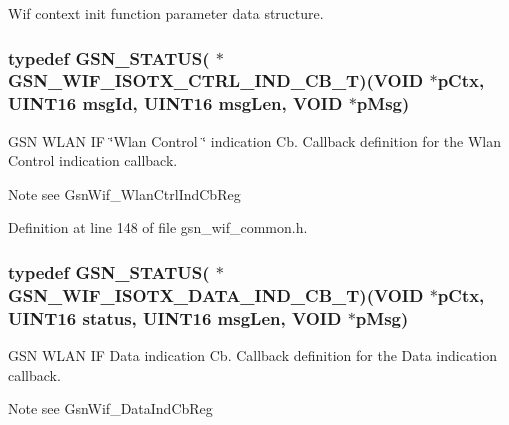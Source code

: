 Wif context init function parameter data structure. 

\hypertarget{a00635_gac721992ff2f8c904a29e80d4b2eaead3}{
\subsubsection[{GSN\_\-WIF\_\-ISOTX\_\-CTRL\_\-IND\_\-CB\_\-T}]{\setlength{\rightskip}{0pt plus 5cm}typedef {\bf GSN\_\-STATUS}( $\ast$ {\bf GSN\_\-WIF\_\-ISOTX\_\-CTRL\_\-IND\_\-CB\_\-T})(VOID $\ast$pCtx, {\bf UINT16} msgId, {\bf UINT16} msgLen, VOID $\ast$pMsg)}}
\label{a00635_gac721992ff2f8c904a29e80d4b2eaead3}


GSN WLAN IF \char`\"{}Wlan Control \char`\"{} indication Cb. Callback definition for the Wlan Control indication callback. 

\begin{DoxyNote}{Note}
see GsnWif\_\-WlanCtrlIndCbReg 
\end{DoxyNote}


Definition at line 148 of file gsn\_\-wif\_\-common.h.

\hypertarget{a00635_ga9630fce1058035404e218cc275052c03}{
\subsubsection[{GSN\_\-WIF\_\-ISOTX\_\-DATA\_\-IND\_\-CB\_\-T}]{\setlength{\rightskip}{0pt plus 5cm}typedef {\bf GSN\_\-STATUS}( $\ast$ {\bf GSN\_\-WIF\_\-ISOTX\_\-DATA\_\-IND\_\-CB\_\-T})(VOID $\ast$pCtx, {\bf UINT16} status, {\bf UINT16} msgLen, VOID $\ast$pMsg)}}
\label{a00635_ga9630fce1058035404e218cc275052c03}


GSN WLAN IF Data indication Cb. Callback definition for the Data indication callback. 

\begin{DoxyNote}{Note}
see GsnWif\_\-DataIndCbReg 
\end{DoxyNote}


